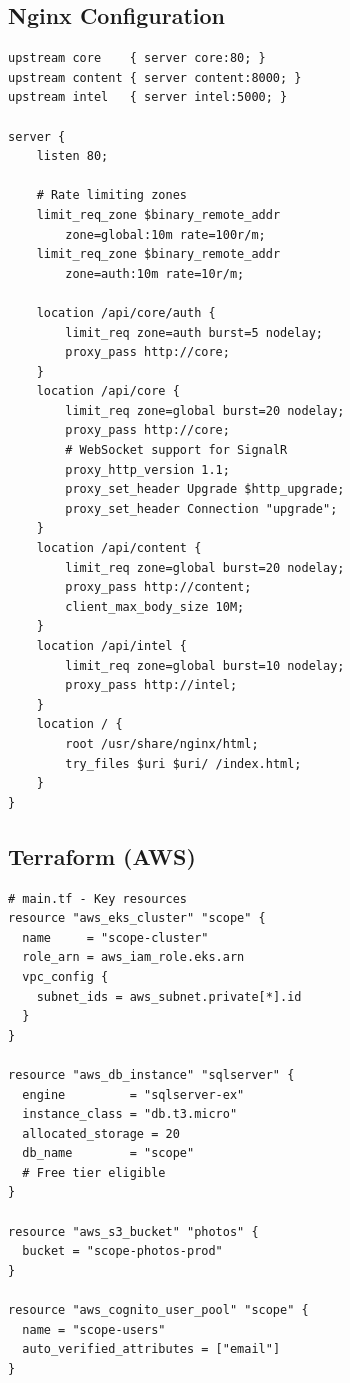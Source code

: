 \documentclass[12pt,letterpaper]{article}
\begin{document}
\subsection{Nginx Configuration}
\begin{lstlisting}[style=code]
upstream core    { server core:80; }
upstream content { server content:8000; }
upstream intel   { server intel:5000; }

server {
    listen 80;

    # Rate limiting zones
    limit_req_zone $binary_remote_addr
        zone=global:10m rate=100r/m;
    limit_req_zone $binary_remote_addr
        zone=auth:10m rate=10r/m;

    location /api/core/auth {
        limit_req zone=auth burst=5 nodelay;
        proxy_pass http://core;
    }
    location /api/core {
        limit_req zone=global burst=20 nodelay;
        proxy_pass http://core;
        # WebSocket support for SignalR
        proxy_http_version 1.1;
        proxy_set_header Upgrade $http_upgrade;
        proxy_set_header Connection "upgrade";
    }
    location /api/content {
        limit_req zone=global burst=20 nodelay;
        proxy_pass http://content;
        client_max_body_size 10M;
    }
    location /api/intel {
        limit_req zone=global burst=10 nodelay;
        proxy_pass http://intel;
    }
    location / {
        root /usr/share/nginx/html;
        try_files $uri $uri/ /index.html;
    }
}
\end{lstlisting}

\subsection{Terraform (AWS)}
\begin{lstlisting}[style=code]
# main.tf - Key resources
resource "aws_eks_cluster" "scope" {
  name     = "scope-cluster"
  role_arn = aws_iam_role.eks.arn
  vpc_config {
    subnet_ids = aws_subnet.private[*].id
  }
}

resource "aws_db_instance" "sqlserver" {
  engine         = "sqlserver-ex"
  instance_class = "db.t3.micro"
  allocated_storage = 20
  db_name        = "scope"
  # Free tier eligible
}

resource "aws_s3_bucket" "photos" {
  bucket = "scope-photos-prod"
}

resource "aws_cognito_user_pool" "scope" {
  name = "scope-users"
  auto_verified_attributes = ["email"]
}
\end{lstlisting}
\end{document}
